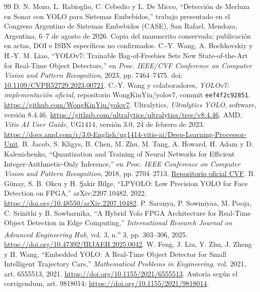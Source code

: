 \documentclass[10pt,conference,a4paper]{elektron}
\begin{document}
\begin{thebibliography}{99}
D. N. Mozo, L. Rabioglio, C. Cebedio y L. De Micco, ``Detección de Merluza en Sonar con YOLO para Sistemas Embebidos,'' trabajo presentado en el Congreso Argentino de Sistemas Embebidos (CASE), San Rafael, Mendoza, Argentina, 6--7 de agosto de 2026. Copia del manuscrito conservada; publicación en actas, DOI e ISBN específicos no confirmados.
C.-Y. Wang, A. Bochkovskiy y H.-Y. M. Liao, ``YOLOv7: Trainable Bag-of-Freebies Sets New State-of-the-Art for Real-Time Object Detectors,'' en \emph{Proc. IEEE/CVF Conference on Computer Vision and Pattern Recognition}, 2023, pp. 7464--7475. doi: \href{https://doi.org/10.1109/CVPR52729.2023.00721}{10.1109/CVPR52729.2023.00721}.
C.-Y. Wang y colaboradores, \emph{YOLOv7: implementación oficial}, repositorio WongKinYiu/yolov7, commit \texttt{eef4f2c92851}. \url{https://github.com/WongKinYiu/yolov7}.
Ultralytics, \emph{Ultralytics YOLO}, software, versión 8.4.46. \url{https://github.com/ultralytics/ultralytics/tree/v8.4.46}.
AMD, \emph{Vitis AI User Guide}, UG1414, versión 3.0, 24 de febrero de 2023. \url{https://docs.amd.com/r/3.0-English/ug1414-vitis-ai/Deep-Learning-Processor-Unit}.
B. Jacob, S. Kligys, B. Chen, M. Zhu, M. Tang, A. Howard, H. Adam y D. Kalenichenko, ``Quantization and Training of Neural Networks for Efficient Integer-Arithmetic-Only Inference,'' en \emph{Proc. IEEE Conference on Computer Vision and Pattern Recognition}, 2018, pp. 2704--2713. \href{https://openaccess.thecvf.com/content_cvpr_2018/html/Jacob_Quantization_and_Training_CVPR_2018_paper.html}{Repositorio oficial CVF}.
B. G\"unay, S. B. Okcu y H. \c{S}akir Bilge, ``LPYOLO: Low Precision YOLO for Face Detection on FPGA,'' arXiv:2207.10482, 2022. \url{https://doi.org/10.48550/arXiv.2207.10482}.
P. Saranya, P. Sowmiyaa, M. Pooja, C. Srinithi y B. Sowbarnika, ``A Hybrid Yolo FPGA Architecture for Real-Time Object Detection in Edge Computing,'' \emph{International Research Journal on Advanced Engineering Hub}, vol. 3, n.\textsuperscript{o} 3, pp. 303--306, 2025. \url{https://doi.org/10.47392/IRJAEH.2025.0042}.
W. Feng, J. Liu, Y. Zhu, J. Zheng y H. Wang, ``Embedded YOLO: A Real-Time Object Detector for Small Intelligent Trajectory Cars,'' \emph{Mathematical Problems in Engineering}, vol. 2021, art. 6555513, 2021. \url{https://doi.org/10.1155/2021/6555513}. Autoría según el corrigendum, art. 9818014: \url{https://doi.org/10.1155/2021/9818014}.

\end{thebibliography}
\end{document}
